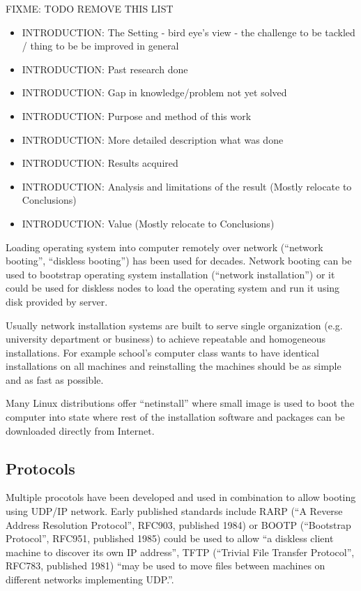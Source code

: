 
FIXME: TODO REMOVE THIS LIST
\begin{itemize}
\item INTRODUCTION: The Setting - bird eye's view - the challenge to be tackled / thing to be be improved in general
\item INTRODUCTION: Past research done
\item INTRODUCTION: Gap in knowledge/problem not yet solved
\item INTRODUCTION: Purpose and method of this work
\item INTRODUCTION: More detailed description what was done
\item INTRODUCTION: Results acquired
\item INTRODUCTION: Analysis and limitations of the result (Mostly relocate to Conclusions)
\item INTRODUCTION: Value (Mostly relocate to Conclusions)
\end{itemize}



Loading operating system into computer remotely over network
(``network booting'', ``diskless booting'') has been used for
decades. Network booting can be used to bootstrap operating system
installation (``network installation'') or it could be used for
diskless nodes to load the operating system and run it using disk
provided by server.

Usually network installation systems are built to serve single
organization (e.g. university department or business) to achieve
repeatable and homogeneous installations. For example school's
computer class wants to have identical installations on all machines
and reinstalling the machines should be as simple and as fast as
possible.

Many Linux distributions offer ``netinstall'' where small image is
used to boot the computer into state where rest of the installation
software and packages can be downloaded directly from Internet.

\subsection{Protocols}

Multiple procotols have been developed and used in combination to
allow booting using UDP/IP network. Early published standards include
RARP (``A Reverse Address Resolution Protocol'', RFC903, published
1984\cite{RFC903}) or BOOTP (``Bootstrap Protocol'', RFC951, published
1985\cite{RFC951}) could be used to allow ``a diskless client machine
to discover its own IP address''\cite{RFC951}, TFTP (``Trivial File
Transfer Protocol'', RFC783, published 1981\cite{RFC783}) ``may be
used to move files between machines on different networks implementing
UDP.''\cite{RFC783}.

